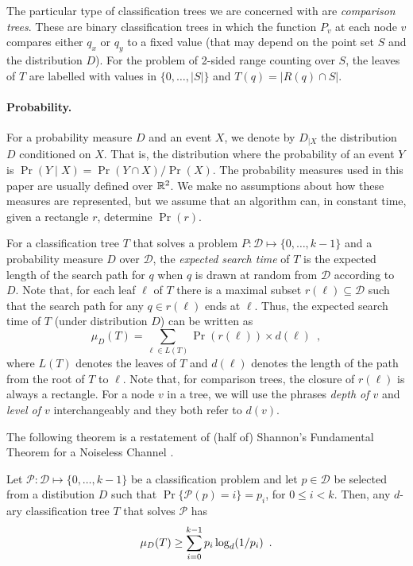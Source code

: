 \documentclass[lotsofwhite,charterfonts]{patmorin}
\newcommand{\depth}{d}
\begin{document}
The particular type of classification trees we are concerned with are
\emph{comparison trees}.  These are binary classification trees in
which the function $P_v$ at each node $v$ compares either $q_x$ or
$q_y$ to a fixed value (that may depend on the point set $S$ and the
distribution $D$).  For the problem of 2-sided range counting over
$S$, the leaves of $T$ are labelled with values in $\{0,\ldots,|S|\}$
and $T(q)=|R(q)\cap S|$.


\paragraph{Probability.}

For a probability measure $D$ and an event $X$, we denote by $D_{|X}$ the
distribution $D$ conditioned on $X$.  That is, the distribution where
the probability of an event $Y$ is $\Pr(Y\mid X)=\Pr(Y\cap X)/\Pr(X)$.
The probability measures used in this paper are usually defined over
$\mathbb{R}^2$.  We make no assumptions about how these measures are
represented, but we assume that an algorithm can, in constant time,
given a rectangle $r$, determine $\Pr(r)$.

For a classification tree $T$ that solves a problem
$P:\mathcal{D}\mapsto\{0,\ldots,k-1\}$ and a probability measure $D$
over $\mathcal{D}$, the \emph{expected search time} of $T$ is the
expected length of the search path for $q$ when $q$ is drawn at random
from $\mathcal{D}$ according to $D$.  Note that, for each leaf $\ell$
of $T$ there is a maximal subset $r(\ell)\subseteq \mathcal{D}$ such
that the search path for any $q\in r(\ell)$ ends at $\ell$.  Thus, the
expected search time of $T$ (under distribution $D$) can be written as
\[
     \mu_D(T) = \sum_{\ell\in L(T)} \Pr(r(\ell))\times \depth(\ell)
	\enspace ,
\]
where $L(T)$ denotes the leaves of $T$ and $\depth(\ell)$ denotes the
length of the path from the root of $T$ to $\ell$. Note that, for
comparison trees, the closure of $r(\ell)$ is always a rectangle.  For
a node $v$ in a tree, we will use the phrases \emph{depth of $v$} and
\emph{level of $v$} interchangeably and they both refer to $d(v)$. 

The following theorem is a restatement of (half of) Shannon's
Fundamental Theorem for a Noiseless Channel \cite[Theorem 9]{s48}.
\begin{thm}
Let $\mathcal{P}:\mathcal{D}\mapsto \{0,\ldots,k-1\}$ be a classification
problem and let $p\in \mathcal{D}$ be selected from a distibution $D$ such
that $\Pr\{\mathcal{P}(p)= i\}=p_i$, for $0\le i< k$.  Then, any
$d$-ary classification tree $T$ that solves $\mathcal{P}$ has
\begin{equation}
     \mu_D(T) \ge \sum_{i=0}^{k-1} p_i\log_d(1/p_i) \enspace .
	\eqlabel{shannon}
\end{equation}
\end{thm}
\end{document}
